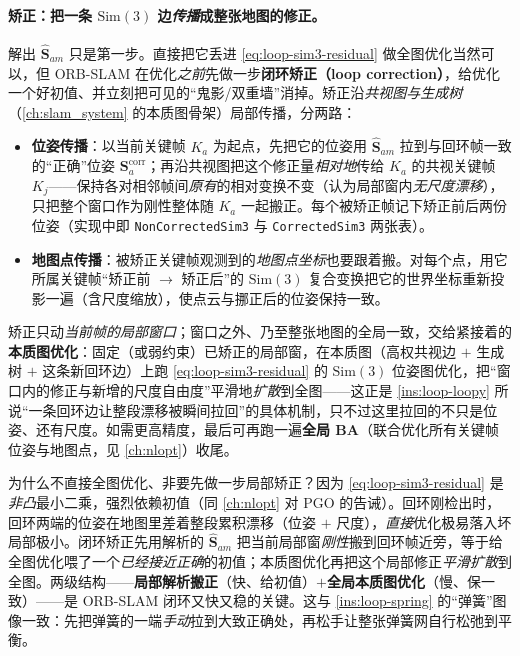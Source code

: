 \paragraph{矫正：把一条 \texorpdfstring{$\mathrm{Sim}(3)$}{Sim(3)} 边\emph{传播}成整张地图的修正。}
解出 $\hat{\mathbf S}_{am}$ 只是第一步。直接把它丢进 \cref{eq:loop-sim3-residual} 做全图优化当然可以，但 ORB-SLAM 在优化\emph{之前}先做一步\textbf{闭环矫正（loop correction）}\cite{murartal2015orbslam,campos2021orbslam3}，给优化一个好初值、并立刻把可见的“鬼影/双重墙”消掉。矫正沿\emph{共视图与生成树}（\cref{ch:slam_system} 的本质图骨架）局部传播，分两路：
\begin{itemize}
  \item \textbf{位姿传播}：以当前关键帧 $K_a$ 为起点，先把它的位姿用 $\hat{\mathbf S}_{am}$ 拉到与回环帧一致的“正确”位姿 $\mathbf S_a^{\text{corr}}$；再沿共视图把这个修正量\emph{相对地}传给 $K_a$ 的共视关键帧 $K_j$——保持各对相邻帧间\emph{原有}的相对变换不变（认为局部窗内\emph{无尺度漂移}），只把整个窗口作为刚性整体随 $K_a$ 一起搬正。每个被矫正帧记下矫正前后两份位姿（实现中即 \texttt{NonCorrectedSim3} 与 \texttt{CorrectedSim3} 两张表）。
  \item \textbf{地图点传播}：被矫正关键帧观测到的\emph{地图点坐标}也要跟着搬。对每个点，用它所属关键帧“矫正前 $\to$ 矫正后”的 $\mathrm{Sim}(3)$ 复合变换把它的世界坐标重新投影一遍（含尺度缩放），使点云与挪正后的位姿保持一致。
\end{itemize}
矫正只动\emph{当前帧的局部窗口}；窗口之外、乃至整张地图的全局一致，交给紧接着的\textbf{本质图优化}\cite{murartal2015orbslam}：固定（或弱约束）已矫正的局部窗，在本质图（高权共视边 $+$ 生成树 $+$ 这条新回环边）上跑 \cref{eq:loop-sim3-residual} 的 $\mathrm{Sim}(3)$ 位姿图优化，把“窗口内的修正与新增的尺度自由度”平滑地\emph{扩散}到全图——这正是 \cref{ins:loop-loopy} 所说“一条回环边让整段漂移被瞬间拉回”的具体机制，只不过这里拉回的不只是位姿、还有尺度。如需更高精度，最后可再跑一遍\textbf{全局 BA}（联合优化所有关键帧位姿与地图点，见 \cref{ch:nlopt}）收尾。

\begin{insight}[闭环矫正 = “先搬正局部、再扩散全局”的两级结构]\label{ins:loop-sim3-twostage}
为什么不直接全图优化、非要先做一步局部矫正？因为 \cref{eq:loop-sim3-residual} 是\emph{非凸}最小二乘，强烈依赖初值（同 \cref{ch:nlopt} 对 PGO 的告诫）。回环刚检出时，回环两端的位姿在地图里差着整段累积漂移（位姿 $+$ 尺度），\emph{直接}优化极易落入坏局部极小。闭环矫正先用解析的 $\hat{\mathbf S}_{am}$ 把当前局部窗\emph{刚性}搬到回环帧近旁，等于给全图优化喂了一个\emph{已经接近正确}的初值；本质图优化再把这个局部修正\emph{平滑扩散}到全图。两级结构——\textbf{局部解析搬正}（快、给初值）$+$\textbf{全局本质图优化}（慢、保一致）——是 ORB-SLAM 闭环又快又稳的关键\cite{murartal2015orbslam}。这与 \cref{ins:loop-spring} 的“弹簧”图像一致：先把弹簧的一端\emph{手动}拉到大致正确处，再松手让整张弹簧网自行松弛到平衡。
\end{insight}

